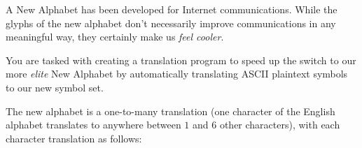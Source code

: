 

A New Alphabet has been developed for Internet communications.  While the glyphs of the new alphabet don't necessarily improve communications in any meaningful way, they certainly make us \emph{feel cooler}.

You are tasked with creating a translation program to speed up the switch to our more \emph{elite} New Alphabet by automatically translating ASCII plaintext symbols to our new symbol set.

The new alphabet is a one-to-many translation (one character of the English alphabet translates to anywhere between $1$ and $6$ other characters), with each character translation as follows:

